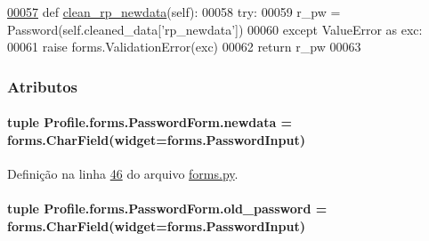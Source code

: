 \begin{DoxyCode}
\hypertarget{classProfile_1_1forms_1_1PasswordForm_l00057}{}\hyperlink{classProfile_1_1forms_1_1PasswordForm_aca8f863d0640235058984375c3ff5491}{00057}     \textcolor{keyword}{def }\hyperlink{classProfile_1_1forms_1_1PasswordForm_aca8f863d0640235058984375c3ff5491}{clean\_rp\_newdata}(self):
00058         \textcolor{keywordflow}{try}:
00059             r\_pw = Password(self.cleaned\_data[\textcolor{stringliteral}{'rp\_newdata'}])
00060         \textcolor{keywordflow}{except} ValueError \textcolor{keyword}{as} exc:
00061             \textcolor{keywordflow}{raise} forms.ValidationError(exc)
00062         \textcolor{keywordflow}{return} r\_pw
00063 
\end{DoxyCode}


\subsubsection{Atributos}
\hypertarget{classProfile_1_1forms_1_1PasswordForm_a8000a7fa167f74f0cd554f39dd1e3871}{}
\paragraph[{newdata}]{\setlength{\rightskip}{0pt plus 5cm}tuple Profile.\+forms.\+Password\+Form.\+newdata = forms.\+Char\+Field(widget=forms.\+Password\+Input)\hspace{0.3cm}{\ttfamily [static]}}\label{classProfile_1_1forms_1_1PasswordForm_a8000a7fa167f74f0cd554f39dd1e3871}


Definição na linha \hyperlink{Profile_2forms_8py_source_l00046}{46} do arquivo \hyperlink{Profile_2forms_8py_source}{forms.\+py}.

\hypertarget{classProfile_1_1forms_1_1PasswordForm_a71438e4977095210067fd7d2f4cf551c}{}
\paragraph[{old\+\_\+password}]{\setlength{\rightskip}{0pt plus 5cm}tuple Profile.\+forms.\+Password\+Form.\+old\+\_\+password = forms.\+Char\+Field(widget=forms.\+Password\+Input)\hspace{0.3cm}{\ttfamily [static]}}\label{classProfile_1_1forms_1_1PasswordForm_a71438e4977095210067fd7d2f4cf551c}


